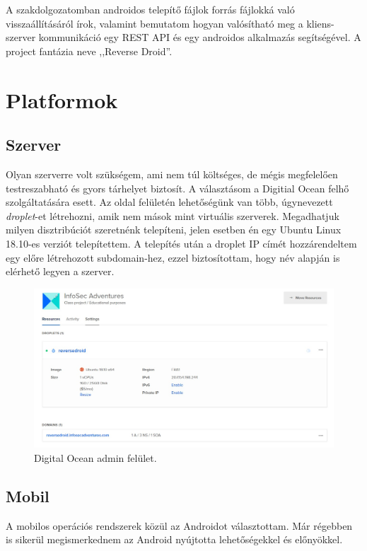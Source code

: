 \documentclass{thesis-ekf}             %
\theoremstyle{definition}
\theoremstyle{remark}
\begin{document}
A szakdolgozatomban androidos telepítő  fájlok forrás fájlokká való visszaállításáról írok, valamint bemutatom hogyan valósítható meg a kliens-szerver kommunikáció egy REST API és egy androidos alkalmazás segítségével. A project fantázia neve ,,Reverse Droid''.

\chapter{Platformok}\label{platformok}

\section{Szerver}

Olyan szerverre volt szükségem, ami nem túl költséges, de mégis megfelelően testreszabható és gyors tárhelyet biztosít. A választásom a Digitial Ocean felhő szolgáltatására esett. Az oldal felületén lehetőségünk van több, úgynevezett \emph{droplet}-et létrehozni, amik nem mások mint virtuális szerverek. Megadhatjuk milyen disztribúciót szeretnénk telepíteni, jelen esetben én egy Ubuntu Linux 18.10-es verziót telepítettem. A telepítés után a droplet IP címét hozzárendeltem egy előre létrehozott subdomain-hez, ezzel biztosítottam, hogy név alapján is elérhető legyen a szerver.

\begin{figure}[!h]
	\centering
	\includegraphics[width=15cm]{kepek/digitalocean}
	\caption{Digital Ocean admin felület.}
	\label{digitalocean}
\end{figure}

\section{Mobil}

A mobilos operációs rendszerek közül az Androidot választottam. Már régebben is sikerül megismerkednem az Android nyújtotta lehetőségekkel és előnyökkel.
\end{document}
